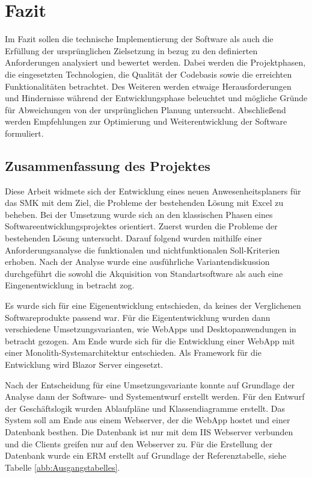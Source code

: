 \section{Fazit}
\label{sec:Fazit}
Im Fazit sollen die technische Implementierung der Software als auch die Erfüllung der ursprünglichen Zielsetzung in bezug zu den definierten Anforderungen analysiert und bewertet werden. Dabei werden die Projektphasen, die eingesetzten Technologien, die Qualität der Codebasis sowie die erreichten Funktionalitäten betrachtet. Des Weiteren werden etwaige Herausforderungen und Hindernisse während der Entwicklungsphase beleuchtet und mögliche Gründe für Abweichungen von der ursprünglichen Planung untersucht. Abschließend werden Empfehlungen zur Optimierung und Weiterentwicklung der Software formuliert.

\subsection{Zusammenfassung des Projektes}
\label{sec:Zusammenfassung}
Diese Arbeit widmete sich der Entwicklung eines neuen Anwesenheitsplaners für das SMK mit dem Ziel, die Probleme der bestehenden Lösung mit Excel zu beheben. Bei der Umsetzung wurde sich an den klassischen Phasen eines Softwareentwicklungsprojektes orientiert. Zuerst wurden die Probleme der bestehenden Lösung untersucht. Darauf folgend wurden mithilfe einer Anforderungsanalyse die funktionalen und nichtfunktionalen Soll-Kriterien erhoben. Nach der Analyse wurde eine ausführliche Variantendiskussion durchgeführt die sowohl die Akquisition von Standartsoftware als auch eine Eingenentwicklung in betracht zog.

Es wurde sich für eine Eigenentwicklung entschieden, da keines der Verglichenen Softwareprodukte passend war. Für die Eigententwicklung wurden dann verschiedene Umsetzungsvarianten, wie WebApps und Desktopanwendungen in betracht gezogen. Am Ende wurde sich für die Entwicklung einer WebApp mit einer Monolith-Systemarchitektur entschieden. Als Framework für die Entwicklung wird Blazor Server eingesetzt.

Nach der Entscheidung für eine Umsetzungsvariante konnte auf Grundlage der Analyse dann der Software- und Systementwurf erstellt werden. Für den Entwurf der Geschäftslogik wurden Ablaufpläne und Klassendiagramme erstellt. Das System soll am Ende aus einem Webserver, der die WebApp hostet und einer Datenbank besthen. Die Datenbank ist nur mit dem IIS Webserver verbunden und die Clients greifen nur auf den Webserver zu. Für die Erstellung der Datenbank wurde ein ERM erstellt auf Grundlage der Referenztabelle, siehe Tabelle \ref{abb:Ausgangstabelles}.

